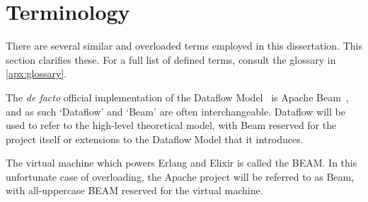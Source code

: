 \section{Terminology}\label{sec:intro:terminology}

There are several similar and overloaded terms employed in this dissertation.
This section clarifies these.
For a full list of defined terms, consult the glossary in \cref{apx:glossary}.

The \emph{de facto} official implementation of the Dataflow Model~\cite{Akidau:2015} is Apache Beam~\cite{ApacheBeam}, and as such `Dataflow' and `Beam' are often interchangeable.
Dataflow will be used to refer to the high-level theoretical model, with Beam reserved for the project itself or extensions to the Dataflow Model that it introduces.

The virtual machine which powers Erlang and Elixir is called the BEAM.
In this unfortunate case of overloading, the Apache project will be referred to as Beam, with all-uppercase BEAM reserved for the virtual machine.
